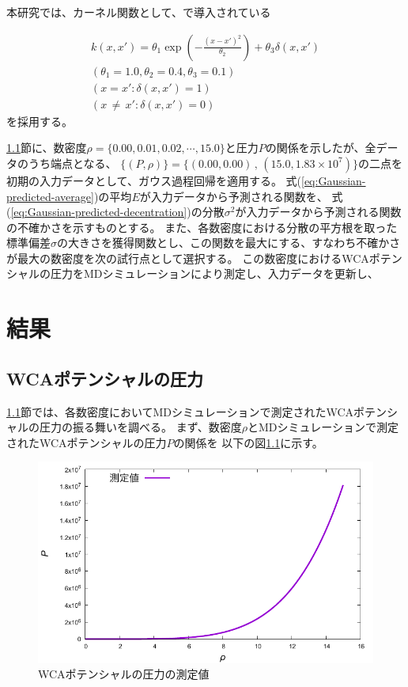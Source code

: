\documentclass[titlepage]{jsreport}
\begin{document}
{{{本研究では、カーネル関数として、\cite{Gauss-machine-learning}で導入されている

\large
\begin{eqnarray}
    k(x,x')=\theta_1\exp\left(-\frac{(x-x')^2}{\theta_2}\right)+\theta_3\delta(x,x')\\ \label{eq:Gauss-kernel}
    (\theta_1=1.0,\theta_2=0.4,\theta_3=0.1) \nonumber \\ 
    (x=x':\delta(x,x')=1) \nonumber \\
    (x\,{\neq}\,x':\delta(x,x')=0) \nonumber
\end{eqnarray}
\normalsize
を採用する。

\ref{results-sec:WCA-press}節に、数密度$\rho=\{0.00,0.01,0.02,\cdots,15.0\}$と圧力$P$の関係を示したが、全データのうち端点となる、
$\{(P,\rho)\}=\{(0.00,0.00)\,,\,(15.0,1.83×10^7)\}$の二点を初期の入力データとして、ガウス過程回帰を適用する。
式(\ref{eq:Gaussian-predicted-average})の平均$E$が入力データから予測される関数を、
式(\ref{eq:Gaussian-predicted-decentration})の分散$\sigma^2$が入力データから予測される関数の不確かさを示すものとする。
また、各数密度における分散の平方根を取った標準偏差$\sigma$の大きさを獲得関数とし、この関数を最大にする、すなわち不確かさが最大の数密度を次の試行点として選択する。
この数密度におけるWCAポテンシャルの圧力をMDシミュレーションにより測定し、入力データを更新し、

\chapter{結果} \label{chap:results}

\section{WCAポテンシャルの圧力}\label{results-sec:WCA-press}
\ref{results-sec:WCA-press}節では、各数密度においてMDシミュレーションで測定されたWCAポテンシャルの圧力の振る舞いを調べる。
まず、数密度$\rho$とMDシミュレーションで測定されたWCAポテンシャルの圧力$P$の関係を
以下の図\ref{fig:den-pre}に示す。

\begin{figure}[htbp]
    \begin{center}
        \includegraphics[width=14cm]{fig/den-pre.pdf}
    \end{center}
    \caption{WCAポテンシャルの圧力の測定値}
    \label{fig:den-pre}
\end{figure}

}}}
\end{document}
